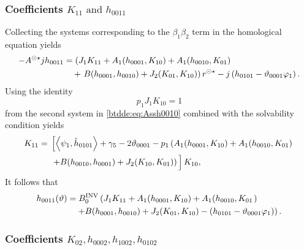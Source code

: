 \subsubsection{Coefficients \texorpdfstring{$K_{11} \text{ and } h_{0011}$}{K11
				and h0011}}

Collecting the systems corresponding to the $\beta_1 \beta_2$ term in the
homological equation yields
\begin{equation}
\label{btdde:eq:Assh0011}
\begin{aligned}
-A^{\odot\star} jh_{0011} &= \left(J_1 K_{11} + A_1(h_{0001},K_{10}) + A_1(h_{0010},K_{01}) \right. \\
						& \quad +
                        \left. B(h_{0001},h_{0010}) + J_2(K_{01},K_{10})\right)r^{\odot\star} - j\left(h_{0101}-\vartheta_{0001}\varphi_1\right).
\end{aligned}
\end{equation}
Using the identity 
%
\begin{equation*}
   p_1J_1K_{10}=1 
\end{equation*}
from the second system in \cref{btdde:eq:Assh0010} combined with the solvability
condition yields
\begin{equation}
\begin{aligned}
    K_{11}={}& \left[\left< \psi_1, \hat h_{0101} \right> + \gamma_5 - 2\vartheta_{0001} 
                 - p_1\left(A_1(h_{0001},K_{10}) + A_1(h_{0010},K_{01}) \right. \right. \nonumber\\
             &\left.\left. + B(h_{0010},h_{0001}) + J_2(K_{10},K_{01}) \right)\vphantom{\left< \psi_1, \hat h_{0101} \right>} \right]K_{10},
\end{aligned}
\end{equation}
It follows that 
\begin{equation}
\begin{aligned}
h_{0011}(\vartheta) &= B^{\mathrm{INV}}_{0} \left( J_1 K_{11} + A_1(h_{0001},K_{10}) + A_1(h_{0010},K_{01} \right.) \\
						& \left. \quad + B(h_{0001},h_{0010}) + J_2(K_{01},K_{10})-\left(h_{0101}-\vartheta_{0001}\varphi_1\right)\right).
\end{aligned}
\end{equation}

\subsubsection{Coefficients
				\texorpdfstring{$K_{02},h_{0002},h_{1002},h_{0102}$}
				{h0002,K02,h1002,h0102}}

